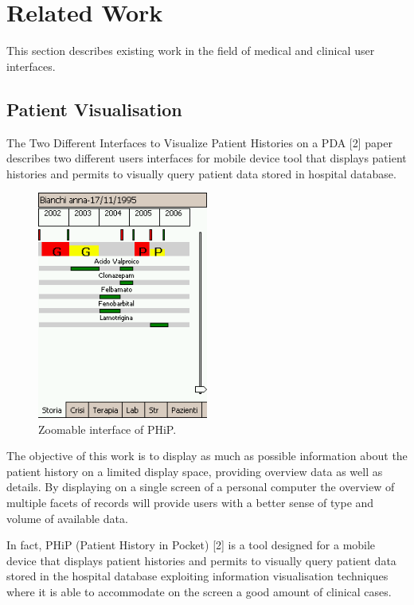 \section{Related Work}

This section describes existing work in the field of medical and clinical user interfaces.

\subsection{Patient Visualisation}

The Two Different Interfaces to Visualize Patient Histories on a PDA [2] paper describes two different users interfaces for mobile device tool that displays patient histories and permits to visually query patient data stored in hospital database.

\clearpage

\begin{figure}[!hbt]
\centering
\includegraphics[width=0.50\textwidth]{zoomable.png}
\caption{\label{fig:zoomable}Zoomable interface of PHiP.
}
\end{figure}

The objective of this work is to display as much as possible information about the patient history on a limited display space, providing overview data as well as details. By displaying on a single screen of a personal computer the overview of multiple facets of records will provide users with a better sense of type and volume of available data.

In fact, PHiP (Patient History in Pocket) [2] is a tool designed for a mobile device that displays patient histories and permits to visually query patient data stored in the hospital database exploiting information visualisation techniques where it is able to accommodate on the screen a good amount of clinical cases.

